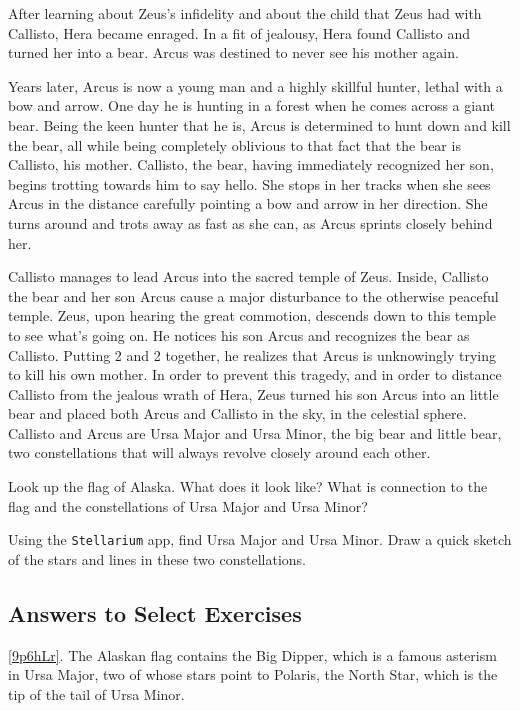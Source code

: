 \documentclass{article}
\numberwithin{equation}{section}
\numberwithin{figure}{section}
\begin{document}
After learning about Zeus's infidelity and about the child that Zeus had with Callisto, Hera became enraged. In a fit of jealousy, Hera found Callisto and turned her into a bear. Arcus was destined to never see his mother again.

\vspace{1ex}

Years later, Arcus is now a young man and a highly skillful hunter, lethal with a bow and arrow. One day he is hunting in a forest when he comes across a giant bear. Being the keen hunter that he is, Arcus is determined to hunt down and kill the bear, all while being completely oblivious to that fact that the bear is Callisto, his mother. Callisto, the bear, having immediately recognized her son, begins trotting towards him to say hello. She stops in her tracks when she sees Arcus in the distance carefully pointing a bow and arrow in her direction. She turns around and trots away as fast as she can, as Arcus sprints closely behind her. 

\vspace{1ex}

Callisto manages to lead Arcus into the sacred temple of Zeus. Inside, Callisto the bear and her son Arcus cause a major disturbance to the otherwise peaceful temple. Zeus, upon hearing the great commotion, descends down to this temple to see what's going on. He notices his son Arcus and recognizes the bear as Callisto. Putting 2 and 2 together, he realizes that Arcus is unknowingly trying to kill his own mother. In order to prevent this tragedy, and in order to distance Callisto from the jealous wrath of Hera, Zeus turned his son Arcus into an little bear and placed both Arcus and Callisto in the sky, in the celestial sphere. Callisto and Arcus are Ursa Major and Ursa Minor, the big bear and little bear, two constellations that will always revolve closely around each other.

\begin{exercise} \label{9p6hLr}
    Look up the flag of Alaska. What does it look like? What is connection to the flag and the constellations of Ursa Major and Ursa Minor?
\end{exercise}

\begin{exercise}
    Using the \texttt{Stellarium} app, find Ursa Major and Ursa Minor. Draw a quick sketch of the stars and lines in these two constellations.
\end{exercise}

\clearpage
\subsection{Answers to Select Exercises}

\ref{9p6hLr}. The Alaskan flag contains the Big Dipper, which is a famous asterism in Ursa Major, two of whose stars point to Polaris, the North Star, which is the tip of the tail of Ursa Minor.
\end{document}
